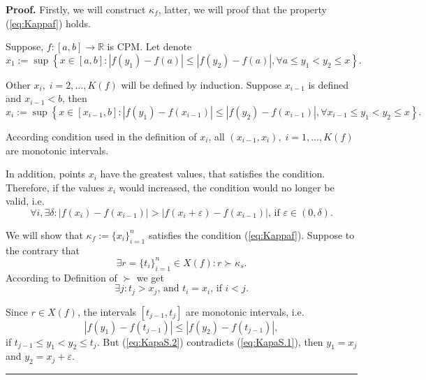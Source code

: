 \documentclass[12pt, a4paper]{article}
\newenvironment{proof}[1][Proof]{\noindent \textbf{#1.} }{\  \rule{0.5em}{0.5em}}
\numberwithin{equation}{section}
\begin{document}
\begin{proof}  
  Firstly, we will construct $\kappa_f$, latter, we will proof
  that the property (\ref{eq:Kappaf}) holds.
  
  Suppose,  $f:[a,b] \rightarrow \mathbb{R}$ is CPM. Let denote
  \begin{equation*}
    x_1:=\sup \left\{x\in[a,b]:|f(y_1)-f(a)| \leq |f(y_2)-f(a)|, \forall a \leq y_1 < y_2 \leq x \right\}.
  \end{equation*} 
  
  Other $x_i,\;i=2,\dots,K(f)$ will be defined by induction. 
  Suppose $x_{i-1}$ is defined and $x_{i-1}<b$, then 
  \begin{equation*}
    x_i:=\sup \left\{x\in[x_{i-1},b]:|f(y_1)-f(x_{i-1})| \leq |f(y_2)-f(x_{i-1})|, \forall x_{i-1} \leq y_1 < y_2 \leq x \right\}.
  \end{equation*}   
  
  According condition used in the definition of $x_i$,
  all $(x_{i-1},x_i),\;i=1,\dots,K(f)$ are monotonic intervals.

  In addition, points $x_i$ have the greatest values, 
  that satisfies the condition. 
  Therefore, if the values $x_i$ would increased,
  the condition would no longer be valid, i.e.   
  \begin{equation}\label{eq:KapaS.1}
   \forall i, \exists \delta: |f(x_i)-f(x_{i-1})|> |f(x_i+\varepsilon)-f(x_{i-1})|\text{, if } \varepsilon \in (0,\delta). 
  \end{equation}   
  
  We will show that  $\kappa_f:=\{x_i\}_{i=1}^{n}$
  satisfies the condition  (\ref{eq:Kappaf}). 
  Suppose to the contrary that
  \begin{equation}
   \exists r=\{t_i\}_{i=1}^{n} \in X(f): r \succ \kappa_s.
  \end{equation}    
  According to Definition of $\succ$ we get
  \begin{equation}
   \exists j: t_j>x_j\text{, and } t_i=x_i \text{, if } i<j.
  \end{equation}     
  
  Since $r \in X(f)$, the intervals $[t_{j-1}, t_j]$ 
  are monotonic intervals, i.e.
  \begin{equation}\label{eq:KapaS.2}
    |f(y_1)-f(t_{j-1})| \leq |f(y_2)-f(t_{j-1})|,
  \end{equation}      
  if $t_{j-1} \leq y_1 < y_2 \leq t_j$.
  But (\ref{eq:KapaS.2}) contradicts (\ref{eq:KapaS.1}), then
  $y_1=x_j$ and $y_2=x_j+\varepsilon$.  
\end{proof}     
  
\end{document}
